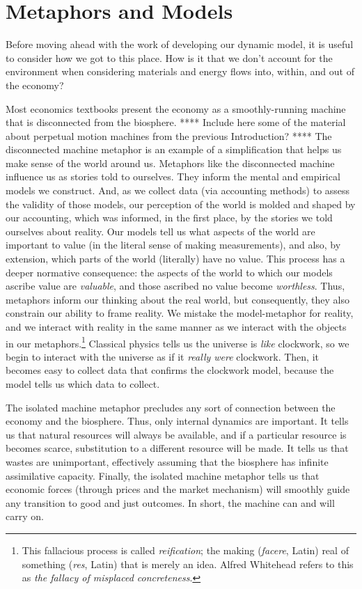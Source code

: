 \section{Metaphors and Models}
\label{sec:metaphors_and_models}


Before moving ahead with the work of developing our dynamic model,
it is useful to consider how we got to this place. 
How is it that we don't account for the environment when 
considering materials and energy flows into, within, and out of the economy?

Most economics textbooks present the economy as a smoothly-running machine
that is disconnected from the biosphere.
**** Include here some of the material about perpetual motion machines
from the previous Introduction? ****
The disconnected machine metaphor is an example of a simplification 
that helps us make sense of the world around us.
Metaphors like the disconnected machine influence us as stories told to ourselves.
They inform the mental and empirical models we construct.
And, as we collect data (via accounting methods) 
to assess the validity of those models,
our perception of the world is molded and shaped
by our accounting, which was informed, in the first place,
by the stories we told ourselves about reality.
Our models tell us what aspects of the world
are important to value 
(in the literal sense of making measurements),
and also, by extension, 
which parts of the world (literally) have no value.
This process has a deeper normative
consequence: the aspects of the world to which our models ascribe
value are \emph{valuable},
and those ascribed no value become \emph{worthless}.
Thus, metaphors inform our thinking about the real world,
but consequently,
they also constrain our ability to frame reality.
We mistake the model-metaphor for reality, and
we interact with reality in the same manner 
as we interact with the objects in our
metaphors.\footnote{This fallacious process is called
	\emph{reification}; the making (\emph{facere}, Latin) real of
	something (\emph{res}, Latin) that is merely an idea.
	Alfred Whitehead refers to this as
	\emph{the fallacy of misplaced concreteness}.\cite{Whitehead2011}}
Classical physics tells us the universe is
\emph{like} clockwork, 
so we begin to interact with the universe
as if it \emph{really were} clockwork.
Then, it becomes easy to collect data that confirms the clockwork model,
because the model tells us which data to collect.

The isolated machine metaphor precludes any sort of connection 
between the economy and the biosphere.
Thus, only internal dynamics are important. 
It tells us that natural resources will always be available, 
and if a particular resource is becomes scarce, 
substitution to a different resource will be made.
It tells us that wastes are unimportant, effectively assuming that the biosphere
has infinite assimilative capacity.
Finally, the isolated machine metaphor tells us that economic forces 
(through prices and the market mechanism) will smoothly guide any transition
to good and just outcomes.
In short, the machine can and will carry on.

